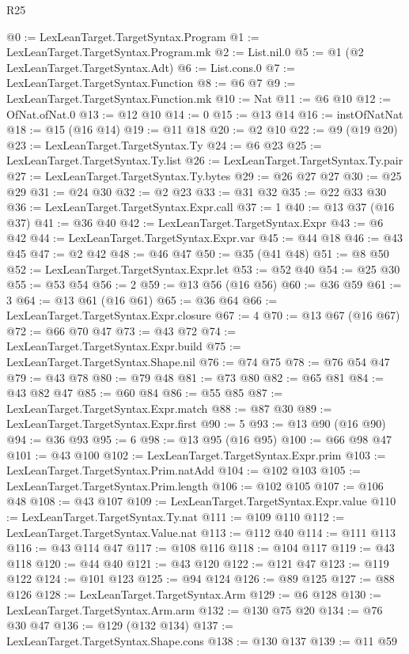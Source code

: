\begin{lexlean}{R25}
\begin{coremodule}
@0 := LexLeanTarget.TargetSyntax.Program
@1 := LexLeanTarget.TargetSyntax.Program.mk
@2 := List.nil.{0}
@5 := @1 (@2 LexLeanTarget.TargetSyntax.Adt)
@6 := List.cons.{0}
@7 := LexLeanTarget.TargetSyntax.Function
@8 := @6 @7
@9 := LexLeanTarget.TargetSyntax.Function.mk
@10 := Nat
@11 := @6 @10
@12 := OfNat.ofNat.{0}
@13 := @12 @10
@14 := 0
@15 := @13 @14
@16 := instOfNatNat
@18 := @15 (@16 @14)
@19 := @11 @18
@20 := @2 @10
@22 := @9 (@19 @20)
@23 := LexLeanTarget.TargetSyntax.Ty
@24 := @6 @23
@25 := LexLeanTarget.TargetSyntax.Ty.list
@26 := LexLeanTarget.TargetSyntax.Ty.pair
@27 := LexLeanTarget.TargetSyntax.Ty.bytes
@29 := @26 @27 @27
@30 := @25 @29
@31 := @24 @30
@32 := @2 @23
@33 := @31 @32
@35 := @22 @33 @30
@36 := LexLeanTarget.TargetSyntax.Expr.call
@37 := 1
@40 := @13 @37 (@16 @37)
@41 := @36 @40
@42 := LexLeanTarget.TargetSyntax.Expr
@43 := @6 @42
@44 := LexLeanTarget.TargetSyntax.Expr.var
@45 := @44 @18
@46 := @43 @45
@47 := @2 @42
@48 := @46 @47
@50 := @35 (@41 @48)
@51 := @8 @50
@52 := LexLeanTarget.TargetSyntax.Expr.let
@53 := @52 @40
@54 := @25 @30
@55 := @53 @54
@56 := 2
@59 := @13 @56 (@16 @56)
@60 := @36 @59
@61 := 3
@64 := @13 @61 (@16 @61)
@65 := @36 @64
@66 := LexLeanTarget.TargetSyntax.Expr.closure
@67 := 4
@70 := @13 @67 (@16 @67)
@72 := @66 @70 @47
@73 := @43 @72
@74 := LexLeanTarget.TargetSyntax.Expr.build
@75 := LexLeanTarget.TargetSyntax.Shape.nil
@76 := @74 @75
@78 := @76 @54 @47
@79 := @43 @78
@80 := @79 @48
@81 := @73 @80
@82 := @65 @81
@84 := @43 @82 @47
@85 := @60 @84
@86 := @55 @85
@87 := LexLeanTarget.TargetSyntax.Expr.match
@88 := @87 @30
@89 := LexLeanTarget.TargetSyntax.Expr.first
@90 := 5
@93 := @13 @90 (@16 @90)
@94 := @36 @93
@95 := 6
@98 := @13 @95 (@16 @95)
@100 := @66 @98 @47
@101 := @43 @100
@102 := LexLeanTarget.TargetSyntax.Expr.prim
@103 := LexLeanTarget.TargetSyntax.Prim.natAdd
@104 := @102 @103
@105 := LexLeanTarget.TargetSyntax.Prim.length
@106 := @102 @105
@107 := @106 @48
@108 := @43 @107
@109 := LexLeanTarget.TargetSyntax.Expr.value
@110 := LexLeanTarget.TargetSyntax.Ty.nat
@111 := @109 @110
@112 := LexLeanTarget.TargetSyntax.Value.nat
@113 := @112 @40
@114 := @111 @113
@116 := @43 @114 @47
@117 := @108 @116
@118 := @104 @117
@119 := @43 @118
@120 := @44 @40
@121 := @43 @120
@122 := @121 @47
@123 := @119 @122
@124 := @101 @123
@125 := @94 @124
@126 := @89 @125
@127 := @88 @126
@128 := LexLeanTarget.TargetSyntax.Arm
@129 := @6 @128
@130 := LexLeanTarget.TargetSyntax.Arm.arm
@132 := @130 @75 @20
@134 := @76 @30 @47
@136 := @129 (@132 @134)
@137 := LexLeanTarget.TargetSyntax.Shape.cons
@138 := @130 @137
@139 := @11 @59

\end{coremodule}
\end{lexlean}
